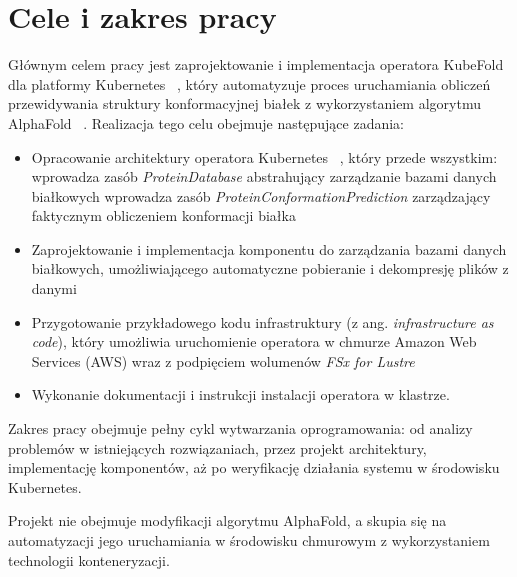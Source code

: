 \section{Cele i zakres pracy}

Głównym celem pracy jest zaprojektowanie i implementacja operatora KubeFold dla platformy Kubernetes ~\cite{kubernetes}, który automatyzuje proces uruchamiania obliczeń przewidywania struktury konformacyjnej białek z wykorzystaniem algorytmu AlphaFold ~\cite{alphafold3}.
Realizacja tego celu obejmuje następujące zadania:

\begin{itemize}
    \item Opracowanie architektury operatora Kubernetes ~\cite{k8s_operators}, który przede wszystkim:
    \subitem wprowadza zasób \textit{ProteinDatabase} abstrahujący zarządzanie bazami danych białkowych
    \subitem wprowadza zasób \textit{ProteinConformationPrediction} zarządzający faktycznym obliczeniem konformacji białka
    \item Zaprojektowanie i implementacja komponentu do zarządzania bazami danych białkowych, umożliwiającego automatyczne pobieranie i dekompresję plików z danymi
    \item Przygotowanie przykładowego kodu infrastruktury (z ang. \textit{infrastructure as code}), który umożliwia uruchomienie operatora w chmurze Amazon Web Services (AWS) wraz z podpięciem wolumenów \textit{FSx for Lustre}
    \item Wykonanie dokumentacji i instrukcji instalacji operatora w klastrze.
\end{itemize}

Zakres pracy obejmuje pełny cykl wytwarzania oprogramowania: od analizy problemów w istniejących rozwiązaniach, przez projekt architektury, implementację komponentów, aż po weryfikację działania systemu w środowisku Kubernetes.

Projekt nie obejmuje modyfikacji algorytmu AlphaFold, a skupia się na automatyzacji jego uruchamiania w środowisku chmurowym z wykorzystaniem technologii konteneryzacji.
